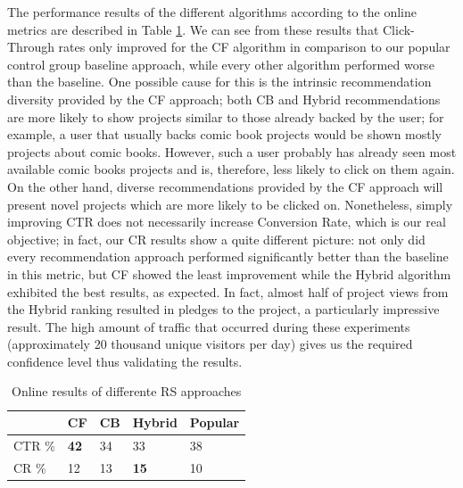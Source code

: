 \documentclass[cic,tc,english]{iiufrgs}
\newcommand{\adriano}[1]{#1}
\begin{document}
The \adriano{performance results of the different algorithms according to the online metrics}  are described in Table \ref{online-results}. We can see from these results that Click-Through rates only improved for the CF algorithm in comparison to our popular control group \adriano{baseline approach}, while every other algorithm performed worse than the baseline. One possible cause for this is the intrinsic recommendation diversity provided by the CF approach; both CB and Hybrid recommendations are more likely to show projects similar to those already backed by the user; for example, a user that usually backs comic book projects would be shown mostly projects about comic books. However, such a user probably has already seen most available comic books projects and is, therefore, less likely to click on them again. On the other hand, diverse recommendations provided by the CF approach will present novel projects which are more likely to be clicked on. Nonetheless, simply improving CTR does not necessarily increase Conversion Rate, which is our real objective; in fact, our CR results show a quite different picture: not only did every recommendation approach performed significantly better than the baseline \adriano{in this metric}, but CF showed the least improvement while the Hybrid algorithm exhibited the best results, as expected. In fact, almost half of project views from the Hybrid ranking resulted in pledges to the project, a particularly impressive result. The high amount of traffic \adriano{that occurred during these experiments (approximately 20 thousand unique visitors per day)} gives us the required confidence level thus validating the results.

\begin{table}[ht!]
\centering
\caption{Online results of differente RS approaches}
\label{online-results}
\begin{tabular}{|l|l|l|l|l|}
\hline
    & CF & CB & Hybrid & Popular \\ \hline
CTR \% & \textbf{42} & 34 & 33     & 38      \\ \hline
CR \% & 12 & 13 & \textbf{15}     & 10      \\ \hline
\end{tabular}
\end{table}
\end{document}
